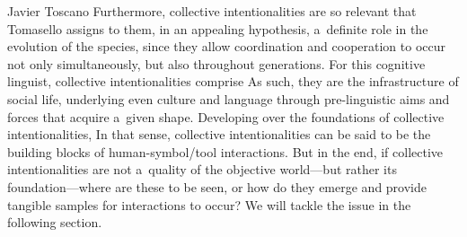 \begin{artengenv}{Javier Toscano}
Furthermore, collective intentionalities are so relevant that Tomasello
\parencite*[][]{tomasello_natural_2014} %
 assigns to them, in an appealing hypothesis, a~definite role in the evolution of the species, since they allow coordination and cooperation to occur not only simultaneously, but also throughout generations. For this cognitive linguist, collective intentionalities comprise
 As such, they are the infrastructure of social life, underlying even culture and language through pre-linguistic aims and forces that acquire a~given shape. Developing over the foundations of collective intentionalities,
 In that sense, collective intentionalities can be said to be the building blocks of human-symbol/tool interactions. But in the end, if collective intentionalities are not a~quality of the objective world---but rather its foundation---where are these to be seen, or how do they emerge and provide tangible samples for interactions to occur? We will tackle the issue in the following section.


\end{artengenv}
